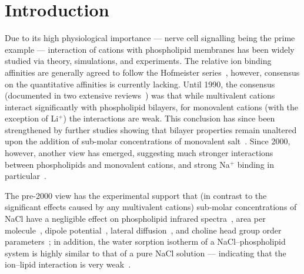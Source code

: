 \documentclass[twoside,twocolumn,9pt]{article}
\begin{document}





\section{Introduction}

Due to its high physiological importance --- nerve cell signalling being the prime example ---
interaction of cations with phospholipid membranes
has been widely studied via theory, simulations, and experiments.
The relative ion binding affinities are generally agreed to
follow the Hofmeister series~\cite{eisenberg79,cevc90,tocanne90,binder02,celma07,leontidis09,vacha09a,klasczyk10,harb13}, 
however,
consensus on the quantitative affinities is currently lacking.
Until 1990, the consensus (documented in two extensive reviews~\cite{cevc90,tocanne90}) was that
while  multivalent cations interact significantly with phospholipid bilayers,
for monovalent cations (with the exception of Li$^+$) the interactions are weak.
This conclusion has since been strengthened by further
studies showing that bilayer properties remain unaltered upon the addition of sub-molar concentrations of monovalent 
salt~\cite{binder02,pabst07,filippov09}.
Since 2000, however, another view has emerged, suggesting much stronger interactions between phospholipids and monovalent cations, and strong Na$^{+}$ binding in particular~\cite{bockmann03,bockmann04,vacha09a,manyes05,manyes06,fukuma07,leontidis09,ferber11,morata12,klasczyk10,harb13}.

The pre-2000 view has the experimental support that
(in contrast to the significant effects caused by any multivalent cations)
sub-molar concentrations of NaCl have a negligible effect on
phospholipid infrared spectra~\cite{binder02},
area per molecule~\cite{pabst07},
dipole potential~\cite{clarke99},
lateral diffusion~\cite{filippov09},
and choline head group order parameters~\cite{akutsu81};
in addition, the water sorption isotherm of a NaCl--phospholipid system
is highly similar to that of a  pure NaCl solution
--- indicating that the ion--lipid interaction is very weak~\cite{binder02}. 
\end{document}
